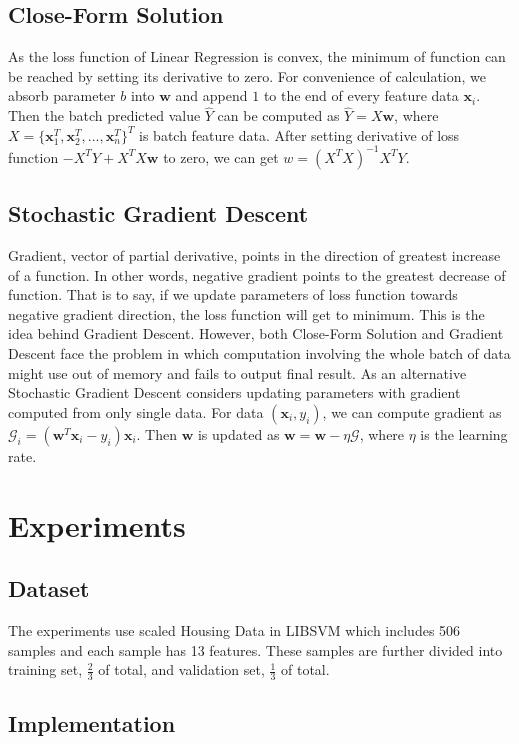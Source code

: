 \documentclass[journal, a4paper]{IEEEtran}
\begin{document}
\subsection{Close-Form Solution}
As the loss function of Linear Regression is convex, the minimum of function can be reached by setting its derivative to zero. For convenience of calculation, we absorb parameter $b$ into $\bm{w}$ and append $1$ to the end of every feature data $\bm{x}_i$. Then the batch predicted value $\hat{Y}$ can be computed as $\hat{Y}=X\bm{w}$, where $X=\{\bm{x}_1^T,\bm{x}_2^T,...,\bm{x}_n^T\}^T$ is batch feature data. After setting derivative of loss function $-X^TY+X^TX\bm{w}$ to zero, we can get $w=(X^TX)^{-1}X^TY$.
\subsection{Stochastic Gradient Descent}
Gradient, vector of partial derivative, points in the direction of greatest increase of a function. In other words, negative gradient points to the greatest decrease of function. That is to say, if we update parameters of loss function towards negative gradient direction, the loss function will get to minimum. This is the idea behind Gradient Descent. However, both Close-Form Solution and Gradient Descent face the problem in which computation involving the whole batch of data might use out of memory and fails to output final result. As an alternative Stochastic Gradient Descent considers updating parameters with gradient computed from only single data. For data $(\bm{x}_i,y_i)$, we can compute gradient as $\mathcal{G}_i=(\bm{w}^T\bm{x}_i-y_i)\bm{x}_i$. Then $\bm{w}$ is updated as $\bm{w}=\bm{w}-\eta\mathcal{G}$, where $\eta$ is the learning rate.

\section{Experiments}
\subsection{Dataset}
The experiments use scaled Housing Data in LIBSVM which includes 506 samples and each sample has 13 features. These samples are further divided into training set, $\frac{2}{3}$ of total, and validation set, $\frac{1}{3}$ of total.
\subsection{Implementation}
\end{document}
